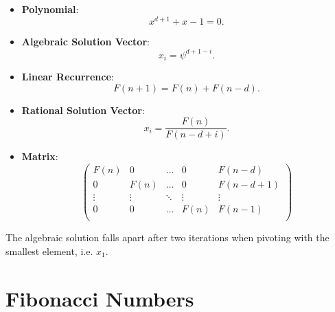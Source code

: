 \begin{itemize}
  \item \textbf{Polynomial}: \[x^{d+1} + x - 1 = 0.\]
  \item \textbf{Algebraic Solution Vector}: \[x_i = \psi^{d+1-i}.\]
  \item \textbf{Linear Recurrence}: \[F(n + 1) = F(n) + F(n - d).\]
  \item \textbf{Rational Solution Vector}: \[x_i = \frac{F(n)}{F(n-d+i)}.\]
  \item \textbf{Matrix}:
    \[\left(\begin{array}{cccc|c}
      F(n)   & 0      & \dots  & 0      & F(n - d) \\
        0    & F(n)   & \dots  & 0      & F(n - d + 1) \\
      \vdots & \vdots & \ddots & \vdots & \vdots   \\
        0    & 0      & \dots  & F(n)   & F(n - 1) \\
    \end{array}\right)\]
\end{itemize}

The algebraic solution falls apart after two iterations when pivoting with the
smallest element, i.e. $x_1$.

\section{Fibonacci Numbers}


